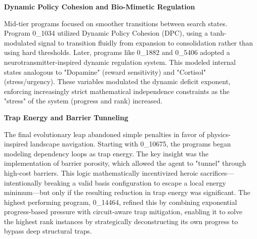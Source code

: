 \documentclass[11pt]{amsart}
\begin{document}
\begin{tcolorbox}[
  enhanced,
  breakable,
  title={Gemini-generated summary},
  colback=gray!3,
  colframe=black!30,
  title after break={Gemini-generated summary (continued)}
]
\noindent \textbf{Dynamic Policy Cohesion and Bio-Mimetic Regulation}

Mid-tier programs focused on smoother transitions between search states. Program 0\_1034 utilized Dynamic Policy Cohesion (DPC), using a tanh-modulated signal to transition fluidly from expansion to consolidation rather than using hard thresholds. Later, programs like 0\_1882 and 0\_5406 adopted a neurotransmitter-inspired dynamic regulation system. This modeled internal states analogous to "Dopamine" (reward sensitivity) and "Cortisol" (stress/urgency). These variables modulated the dynamic deficit exponent, enforcing increasingly strict mathematical independence constraints as the "stress" of the system (progress and rank) increased.

\noindent \textbf{Trap Energy and Barrier Tunneling}

The final evolutionary leap abandoned simple penalties in favor of physics-inspired landscape navigation. Starting with 0\_10675, the programs began modeling dependency loops as trap energy. The key insight was the implementation of barrier porosity, which allowed the agent to "tunnel" through high-cost barriers. This logic mathematically incentivized heroic sacrifices—intentionally breaking a valid basis configuration to escape a local energy minimum—but only if the resulting reduction in trap energy was significant. The highest performing program, 0\_14464, refined this by combining exponential progress-based pressure with circuit-aware trap mitigation, enabling it to solve the highest rank instances by strategically deconstructing its own progress to bypass deep structural traps.
\end{tcolorbox}
\end{document}
